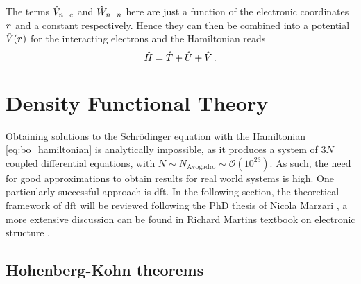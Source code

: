 \documentclass[main.tex]{subfiles}
\begin{document}
The terms \(\hat{V}_{n-e}\) and \(\hat{W}_{n-n}\) here are just a function of the electronic coordinates \(\vb*{r}\) and a constant respectively. Hence they can then be combined into a potential \(\hat{V} (\vb*{r})\) for the interacting electrons and the Hamiltonian reads
\begin{equation}\label{eq:solid_state_hamiltonian}
    \hat{H} = \hat{T} + \hat{U} + \hat{V}\,.
\end{equation}

\section{Density Functional Theory\label{sec:theory_dft}}

Obtaining solutions to the Schrödinger equation with the Hamiltonian \ref{eq:bo_hamiltonian} is analytically impossible, as it produces a system of \(3N\) coupled differential equations, with \(N \sim N_{\mathrm{Avogadro}} \sim \mathcal{O} (10^{23})\).
As such, the need for good approximations to obtain results for real world
systems is high.
One particularly successful approach is \acrfull{dft}.
In the following section, the theoretical framework of \acrshort{dft} will be reviewed following the PhD thesis of Nicola Marzari \cite{marzari_ab-initio_1996}, a more extensive discussion can be found in Richard Martins textbook on electronic structure \cite{martin_electronic_2004}.

\subsection{Hohenberg-Kohn theorems}
\end{document}
